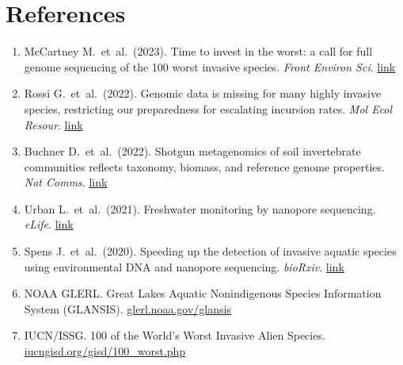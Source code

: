 \documentclass[11pt, letterpaper]{article}
\begin{document}
\section*{References}

\begin{enumerate}[leftmargin=1.5em]
  \item McCartney M.\ et~al.\ (2023). Time to invest in the worst: a call for full genome sequencing of the 100 worst invasive species. \textit{Front Environ Sci}. \href{https://www.frontiersin.org/journals/environmental-science/articles/10.3389/fenvs.2023.1258880/full}{link}
  \item Rossi G.\ et~al.\ (2022). Genomic data is missing for many highly invasive species, restricting our preparedness for escalating incursion rates. \textit{Mol Ecol Resour}. \href{https://ncbi.nlm.nih.gov/pmc/articles/PMC9385848}{link}
  \item Buchner D.\ et~al.\ (2022). Shotgun metagenomics of soil invertebrate communities reflects taxonomy, biomass, and reference genome properties. \textit{Nat Comms}. \href{https://pmc.ncbi.nlm.nih.gov/articles/PMC9170594/}{link}
  \item Urban L.\ et~al.\ (2021). Freshwater monitoring by nanopore sequencing. \textit{eLife}. \href{https://elifesciences.org/articles/61504}{link}
  \item Spens J.\ et~al.\ (2020). Speeding up the detection of invasive aquatic species using environmental DNA and nanopore sequencing. \textit{bioRxiv}. \href{https://www.biorxiv.org/content/10.1101/2020.06.09.142521.full.pdf}{link}
  \item NOAA GLERL. Great Lakes Aquatic Nonindigenous Species Information System (GLANSIS). \href{https://www.glerl.noaa.gov/glansis/}{glerl.noaa.gov/glansis}
  \item IUCN/ISSG. 100 of the World's Worst Invasive Alien Species. \href{https://www.iucngisd.org/gisd/100_worst.php}{iucngisd.org/gisd/100\_worst.php}
\end{enumerate}
\end{document}
